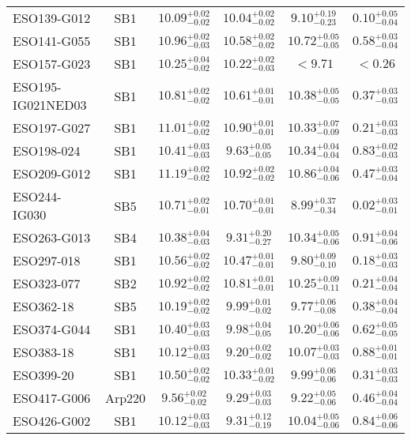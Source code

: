 \documentclass[onecolumn]{mn2e}
\begin{document}
{\begin{center}
\begin{longtable}{lccccc}
ESO139-G012 & SB1 & $10.09_{-0.02}^{+0.02}$ & $10.04_{-0.02}^{+0.02}$ & $9.10_{-0.23}^{+0.19}$ &$0.10_{-0.04}^{+0.05}$ \\
ESO141-G055 & SB1 & $10.96_{-0.03}^{+0.02}$ & $10.58_{-0.02}^{+0.02}$ & $10.72_{-0.05}^{+0.05}$ &$0.58_{-0.04}^{+0.03}$ \\
ESO157-G023 & SB1 & $10.25_{-0.02}^{+0.04}$ & $10.22_{-0.03}^{+0.02}$ & $<9.71$ &$<0.26$ \\
ESO195-IG021NED03 & SB1 & $10.81_{-0.02}^{+0.02}$ & $10.61_{-0.01}^{+0.01}$ & $10.38_{-0.05}^{+0.05}$ &$0.37_{-0.03}^{+0.03}$ \\
ESO197-G027 & SB1 & $11.01_{-0.02}^{+0.02}$ & $10.90_{-0.01}^{+0.01}$ & $10.33_{-0.09}^{+0.07}$ &$0.21_{-0.03}^{+0.03}$ \\
ESO198-024 & SB1 & $10.41_{-0.03}^{+0.03}$ & $9.63_{-0.05}^{+0.05}$ & $10.34_{-0.04}^{+0.04}$ &$0.83_{-0.03}^{+0.02}$ \\
ESO209-G012 & SB1 & $11.19_{-0.02}^{+0.02}$ & $10.92_{-0.02}^{+0.02}$ & $10.86_{-0.06}^{+0.04}$ &$0.47_{-0.04}^{+0.03}$ \\
ESO244-IG030 & SB5 & $10.71_{-0.01}^{+0.02}$ & $10.70_{-0.01}^{+0.01}$ & $8.99_{-0.34}^{+0.37}$ &$0.02_{-0.01}^{+0.03}$ \\
ESO263-G013 & SB4 & $10.38_{-0.03}^{+0.04}$ & $9.31_{-0.27}^{+0.20}$ & $10.34_{-0.06}^{+0.05}$ &$0.91_{-0.06}^{+0.04}$ \\
ESO297-018 & SB1 & $10.56_{-0.02}^{+0.02}$ & $10.47_{-0.01}^{+0.01}$ & $9.80_{-0.10}^{+0.09}$ &$0.18_{-0.03}^{+0.03}$ \\
ESO323-077 & SB2 & $10.92_{-0.02}^{+0.02}$ & $10.81_{-0.01}^{+0.01}$ & $10.25_{-0.11}^{+0.09}$ &$0.21_{-0.04}^{+0.04}$ \\
ESO362-18 & SB5 & $10.19_{-0.02}^{+0.02}$ & $9.99_{-0.02}^{+0.01}$ & $9.77_{-0.08}^{+0.06}$ &$0.38_{-0.04}^{+0.04}$ \\
ESO374-G044 & SB1 & $10.40_{-0.03}^{+0.03}$ & $9.98_{-0.05}^{+0.04}$ & $10.20_{-0.06}^{+0.06}$ &$0.62_{-0.05}^{+0.05}$ \\
ESO383-18 & SB1 & $10.12_{-0.03}^{+0.03}$ & $9.20_{-0.02}^{+0.02}$ & $10.07_{-0.03}^{+0.03}$ &$0.88_{-0.01}^{+0.01}$ \\
ESO399-20 & SB1 & $10.50_{-0.02}^{+0.02}$ & $10.33_{-0.02}^{+0.01}$ & $9.99_{-0.06}^{+0.06}$ &$0.31_{-0.03}^{+0.03}$ \\
ESO417-G006 & Arp220 & $9.56_{-0.02}^{+0.02}$ & $9.29_{-0.03}^{+0.03}$ & $9.22_{-0.06}^{+0.05}$ &$0.46_{-0.04}^{+0.04}$ \\
ESO426-G002 & SB1 & $10.12_{-0.03}^{+0.03}$ & $9.31_{-0.19}^{+0.12}$ & $10.04_{-0.06}^{+0.05}$ &$0.84_{-0.06}^{+0.06}$ \\

\end{longtable}
\end{center}}
\end{document}
